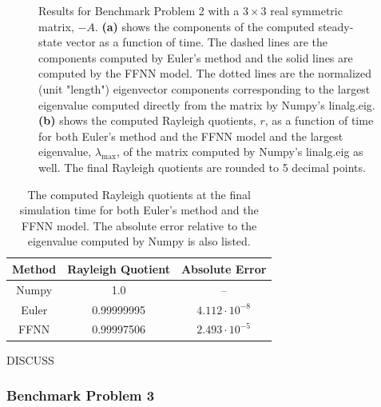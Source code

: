 \begin{figure}[H]
\centering
{}
\qquad
{}
\caption{Results for Benchmark Problem 2 with a $3\times 3$ real symmetric matrix, $-A$. \textbf{(a)} shows the components of the computed steady-state vector as a function of time. The dashed lines are the components computed by Euler's method and the solid lines are computed by the FFNN model. The dotted lines are the normalized (unit "length") eigenvector components corresponding to the largest eigenvalue computed directly from the matrix by Numpy's linalg.eig. \textbf{(b)} shows the computed Rayleigh quotients, $r$, as a function of time for both Euler's method and the FFNN model and the largest eigenvalue, $\lambda_\mathrm{max}$, of the matrix computed by Numpy's linalg.eig as well. The final Rayleigh quotients are rounded to 5 decimal points.}
\label{fig:benchrun2}
\end{figure}

\begin{table}[H]
\caption{The computed Rayleigh quotients at the final simulation time for both Euler's method and the FFNN model. The absolute error relative to the eigenvalue computed by Numpy is also listed.}
\centering
{}
\begin{tabular}{c|c|c}
\hline
\hline 
Method & Rayleigh Quotient & Absolute Error
\\
\hline 
\hline 
Numpy & 1.0 & –
\\
Euler & 0.99999995 & $4.112 \cdot 10^{-8}$  
\\
FFNN & 0.99997506 & $2.493 \cdot 10^{-5}$
\\
\hline
\hline 
\end{tabular}
\label{tab:eigbench2}
\end{table}


DISCUSS


\subsubsection{Benchmark Problem 3}

